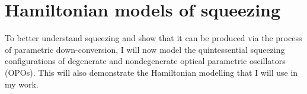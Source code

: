 

\section{Hamiltonian models of squeezing}
\label{sec:Hamiltonian_modelling}


To better understand squeezing and show that it can be produced via the process of parametric down-conversion, I will now model the quintessential squeezing configurations of degenerate and nondegenerate optical parametric oscillators (OPOs). This will also demonstrate the Hamiltonian modelling that I will use in my work.


